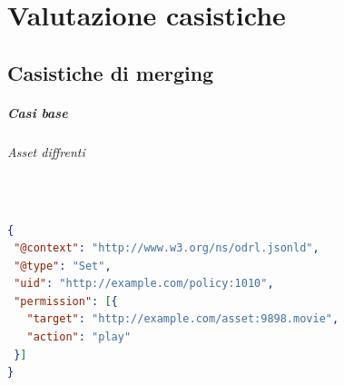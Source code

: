 \documentclass[12pt,a4paper,twoside]{book}
\begin{document}
\chapter{Valutazione casistiche}
\section{Casistiche di merging}
\paragraph{Casi base}
\subparagraph{Asset diffrenti}\mbox{}\\

\begin{lstlisting}[language=json,firstnumber=1,caption={La policy 1010 permette di riprodurre l'asset 9898.movie a chiunque},captionpos=b]
{
 "@context": "http://www.w3.org/ns/odrl.jsonld",
 "@type": "Set",
 "uid": "http://example.com/policy:1010",
 "permission": [{
   "target": "http://example.com/asset:9898.movie",
   "action": "play"
 }]
}

\end{lstlisting}
\end{document}
